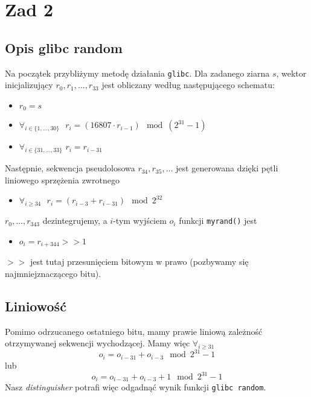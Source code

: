 \section*{Zad 2}

\subsection*{Opis glibc random}
Na początek przybliżymy metodę działania \texttt{glibc}. Dla zadanego ziarna $s$, wektor inicjalizujący $r_0,r_1,\ldots,r_33$ jest obliczany według następującego schematu:

\begin{itemize}
    \item $r_0 = s$
    \item $\forall_{i\in \{1,\ldots,30\}}\hspace{8pt} r_i = (16807 \cdot r_{i-1}) \mod (2^{31} - 1)$
    \item $\forall_{i\in \{31,\ldots,33\}}\hspace{4pt} r_i = r_{i - 31}$
\end{itemize}

Następnie, sekwencja pseudolosowa $r_{34},r_{35},\ldots$ jest generowana dzięki pętli liniowego sprzężenia zwrotnego

\begin{itemize}
    \item $\forall_{i\geq 34}\hspace{8pt} r_i = (r_{i-3} + r_{i-31}) \mod 2^{32}$
\end{itemize}

$r_0,\ldots,r_{343}$ dezintegrujemy, a $i$-tym wyjściem $o_i$ funkcji \texttt{myrand()} jest

\begin{itemize}
    \item $o_i = r_{i+344} >> 1$
\end{itemize}

$>>$ jest tutaj przesunięciem bitowym w prawo (pozbywamy się najmniejznaczącego bitu).

\subsection*{Liniowość}
Pomimo odrzucanego ostatniego bitu, mamy prawie liniową zależność otrzymywanej sekwencji wychodzącej. Mamy więc $\forall_{i\geq 31}$
$$ o_i = o_{i-31} + o_{i-3} \mod 2^{31} - 1 $$
lub
$$ o_i = o_{i-31} + o_{i-3} + 1 \mod 2^{31} - 1 $$
Nasz \textit{distinguisher} potrafi więc odgadnąć wynik funkcji \texttt{glibc random}.